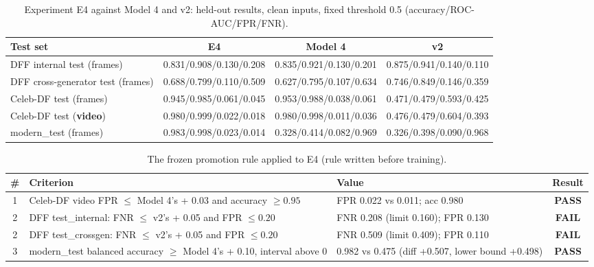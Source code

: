 \begin{table}[ht]\centering\caption[Experiment E4 against Model 4 and v2: held-out results]{Experiment E4 against Model 4 and v2: held-out results, clean inputs, fixed threshold 0.5 (accuracy/ROC-AUC/FPR/FNR).}\label{tab:e4-key}\footnotesize
\begin{adjustbox}{max width=\linewidth,center}\begin{tabular}{|l|c|c|c|}\hline \textbf{Test set} & \textbf{E4} & \textbf{Model 4} & \textbf{v2} \\ \hline
DFF internal test (frames) & 0.831/0.908/0.130/0.208 & 0.835/0.921/0.130/0.201 & 0.875/0.941/0.140/0.110 \\ \hline
DFF cross-generator test (frames) & 0.688/0.799/0.110/0.509 & 0.627/0.795/0.107/0.634 & 0.746/0.849/0.146/0.359 \\ \hline
Celeb-DF test (frames) & 0.945/0.985/0.061/0.045 & 0.953/0.988/0.038/0.061 & 0.471/0.479/0.593/0.425 \\ \hline
Celeb-DF test (\textbf{video}) & 0.980/0.999/0.022/0.018 & 0.980/0.998/0.011/0.036 & 0.476/0.479/0.604/0.393 \\ \hline
modern\_test (frames) & 0.983/0.998/0.023/0.014 & 0.328/0.414/0.082/0.969 & 0.326/0.398/0.090/0.968 \\ \hline
\end{tabular}\end{adjustbox}\end{table}

\begin{table}[ht]\centering\caption{The frozen promotion rule applied to E4 (rule written before training).}\label{tab:promo-e4a}\small\begin{adjustbox}{max width=\linewidth,center}\begin{tabular}{|c|p{5.2cm}|p{4.2cm}|c|}\hline
\textbf{\#} & \textbf{Criterion} & \textbf{Value} & \textbf{Result} \\ \hline
1 & Celeb-DF video FPR $\le$ Model 4's + 0.03 and accuracy $\ge0.95$ & FPR 0.022 vs 0.011; acc 0.980 & \textbf{PASS} \\ \hline
2 & DFF test\_internal: FNR $\le$ v2's + 0.05 and FPR $\le0.20$ & FNR 0.208 (limit 0.160); FPR 0.130 & \textbf{FAIL} \\ \hline
2 & DFF test\_crossgen: FNR $\le$ v2's + 0.05 and FPR $\le0.20$ & FNR 0.509 (limit 0.409); FPR 0.110 & \textbf{FAIL} \\ \hline
3 & modern\_test balanced accuracy $\ge$ Model 4's + 0.10, interval above 0 & 0.982 vs 0.475 (diff +0.507, lower bound +0.498) & \textbf{PASS} \\ \hline
\end{tabular}\end{adjustbox}\end{table}
